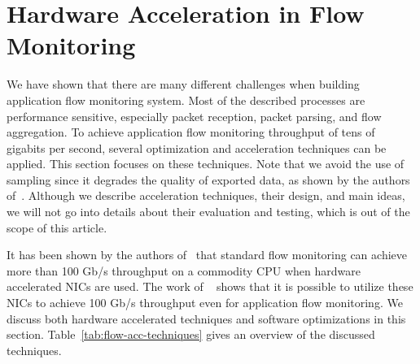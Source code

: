 

\section{Hardware Acceleration in Flow Monitoring}\label{sec:performance-hw-acceleration}


We have shown that there are many different challenges when building application flow monitoring system. Most of the described processes are performance sensitive, especially packet reception, packet parsing, and flow aggregation. To achieve application flow monitoring throughput of tens of gigabits per second, several optimization and acceleration techniques can be applied. This section focuses on these techniques. Note that we avoid the use of sampling since it degrades the quality of exported data, as shown by the authors of~\cite{Brauckhoff-2006-Impact}. Although we describe acceleration techniques, their design, and main ideas, we will not go into details about their evaluation and testing, which is out of the scope of this article. 

It has been shown by the authors of~\cite{Velan-2015-High} that standard flow monitoring can achieve more than 100 Gb/s throughput on a commodity CPU when hardware accelerated NICs are used. The work of \citeauthor{Kekely-2016-Software}~\cite{Kekely-2016-Software} shows that it is possible to utilize these NICs to achieve 100 Gb/s throughput even for application flow monitoring. We discuss both hardware accelerated techniques and software optimizations in this section. Table~\ref{tab:flow-acc-techniques} gives an overview of the discussed techniques.

